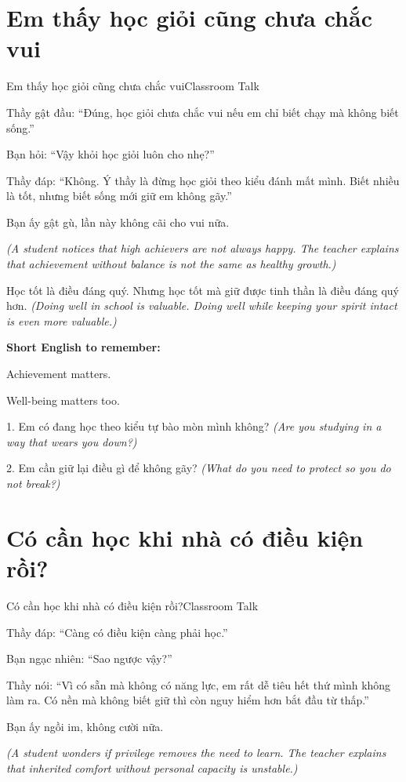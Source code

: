 \section{Em thấy học giỏi cũng chưa chắc vui}
\begin{truyen}{Em thấy học giỏi cũng chưa chắc vui}{Classroom Talk}

Thầy gật đầu: ``Đúng, học giỏi chưa chắc vui nếu em chỉ biết chạy mà không biết sống.''

Bạn hỏi: ``Vậy khỏi học giỏi luôn cho nhẹ?''

Thầy đáp: ``Không. Ý thầy là đừng học giỏi theo kiểu đánh mất mình. Biết nhiều là tốt, nhưng biết sống mới giữ em không gãy.''

Bạn ấy gật gù, lần này không cãi cho vui nữa.

\textit{(A student notices that high achievers are not always happy. The teacher explains that achievement without balance is not the same as healthy growth.)}
\end{truyen}

\begin{baihoc}
Học tốt là điều đáng quý. Nhưng học tốt mà giữ được tinh thần là điều đáng quý hơn.
\textit{(Doing well in school is valuable. Doing well while keeping your spirit intact is even more valuable.)}
\end{baihoc}

\begin{ghinhoanh}
\textbf{Short English to remember:}

Achievement matters.

Well-being matters too.
\end{ghinhoanh}

\begin{tuhocnhanh}
1. Em có đang học theo kiểu tự bào mòn mình không? \textit{(Are you studying in a way that wears you down?)}

2. Em cần giữ lại điều gì để không gãy? \textit{(What do you need to protect so you do not break?)}
\end{tuhocnhanh}
\ngancach

\section{Có cần học khi nhà có điều kiện rồi?}
\begin{truyen}{Có cần học khi nhà có điều kiện rồi?}{Classroom Talk}

Thầy đáp: ``Càng có điều kiện càng phải học.''

Bạn ngạc nhiên: ``Sao ngược vậy?''

Thầy nói: ``Vì có sẵn mà không có năng lực, em rất dễ tiêu hết thứ mình không làm ra. Có nền mà không biết giữ thì còn nguy hiểm hơn bắt đầu từ thấp.''

Bạn ấy ngồi im, không cười nữa.

\textit{(A student wonders if privilege removes the need to learn. The teacher explains that inherited comfort without personal capacity is unstable.)}
\end{truyen}

